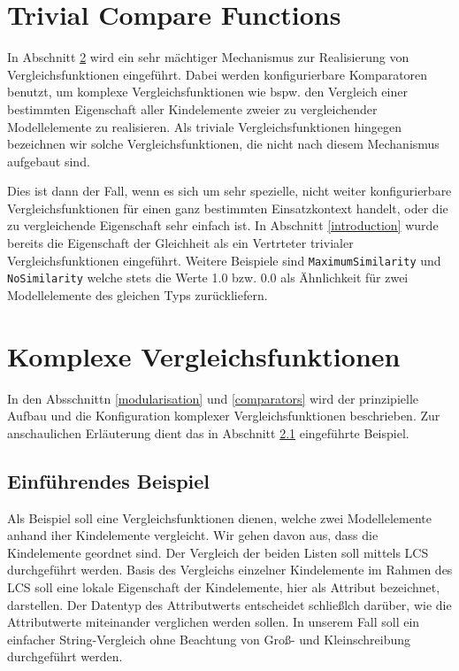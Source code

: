 \documentclass[10pt,a4paper]{scrartcl}
\begin{document}
\section{Trivial Compare Functions}
\label{trivial-functions}
In Abschnitt \ref{complex-functions} wird ein sehr mächtiger Mechanismus zur Realisierung von Vergleichsfunktionen
eingeführt. Dabei werden konfigurierbare Komparatoren benutzt, um komplexe Vergleichsfunktionen
wie bspw. den Vergleich einer bestimmten Eigenschaft aller Kindelemente zweier zu vergleichender
Modellelemente zu realisieren. Als triviale Vergleichsfunktionen hingegen bezeichnen wir solche 
Vergleichsfunktionen, die nicht nach diesem Mechanismus aufgebaut sind.

Dies ist dann der Fall, wenn es sich um sehr spezielle, nicht weiter konfigurierbare
Vergleichsfunktionen für einen ganz bestimmten Einsatzkontext handelt, oder die zu vergleichende 
Eigenschaft sehr einfach ist. In Abschnitt \ref{introduction} wurde bereits die Eigenschaft der
Gleichheit als ein Vertrteter trivialer Vergleichsfunktionen eingeführt. Weitere Beispiele sind
\texttt{MaximumSimilarity} und \texttt{NoSimilarity} welche stets die Werte 1.0 bzw. 0.0 als 
Ähnlichkeit für zwei Modellelemente des gleichen Typs zurückliefern.



\section{Komplexe Vergleichsfunktionen}
\label{complex-functions}

In den Absschnittn \ref{modularisation} und \ref{comparators} wird der prinzipielle Aufbau und die
Konfiguration komplexer Vergleichsfunktionen beschrieben. 
Zur anschaulichen Erläuterung dient das in Abschnitt \ref{ref-example} eingeführte Beispiel.


\subsection{Einführendes Beispiel}
\label{ref-example}
Als Beispiel soll eine Vergleichsfunktionen dienen, welche zwei Modellelemente anhand iher Kindelemente
vergleicht. Wir gehen davon aus, dass die Kindelemente geordnet sind. Der Vergleich der beiden
Listen soll mittels LCS durchgeführt werden. Basis des Vergleichs einzelner Kindelemente
im Rahmen des LCS soll eine lokale Eigenschaft der Kindelemente, hier als Attribut bezeichnet,
darstellen. Der Datentyp des Attributwerts entscheidet schließlch darüber, wie die Attributwerte
miteinander verglichen werden sollen. In unserem Fall soll ein einfacher String-Vergleich ohne
Beachtung von Groß- und Kleinschreibung durchgeführt werden.
\end{document}
